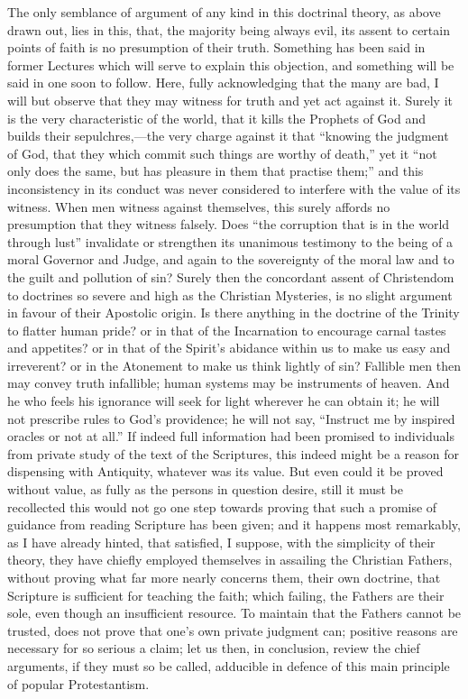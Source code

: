 The only semblance of argument of any kind in this doctrinal
theory, as above drawn out, lies in this, that, the majority being
always evil, its assent to certain points of faith is no presumption
of their truth. Something has been said in former Lectures which will
serve to explain this objection, and something will be said in one
soon to follow. Here, fully acknowledging that the many are bad, I
will but observe that they may witness for truth and yet act
against it. Surely it is the very characteristic of the world, that it
kills the Prophets of God and builds their sepulchres,—the very
charge against it that ``knowing the judgment of God, that they
which commit such things are worthy of death,'' yet it ``not
only does the same, but has pleasure in them that practise them;''
and this inconsistency in its conduct was never considered to
interfere with the value of its witness. When men witness against
themselves, this surely affords no presumption that they witness
falsely. Does ``the corruption that is in the world through
lust'' invalidate or strengthen its unanimous testimony to the
being of a moral Governor and Judge, and again to the sovereignty of
the moral law and to the guilt and pollution of sin? Surely then the
concordant assent of Christendom to doctrines so severe and high as
the Christian Mysteries, is no slight argument in favour of their
Apostolic origin. Is there anything in the doctrine of the Trinity to
flatter human pride? or in that of the Incarnation to encourage carnal
tastes and appetites? or in that of the Spirit's abidance within us to
make us easy and irreverent? or in the Atonement to make us think
lightly of sin? Fallible men then may convey truth infallible; human
systems may be instruments of heaven. And he who feels his ignorance
will seek for light wherever he can obtain it; he will not prescribe
rules to God's providence; he will not say, ``Instruct me by
inspired oracles or not at all.'' If indeed full information had
been promised to individuals from private study of the text of the
Scriptures, this indeed might be a reason for dispensing with
Antiquity, whatever was its value. But even could it be proved without
value, as fully as the persons in question desire, still it must be
recollected this would not go one step towards proving that such a
promise of guidance from reading Scripture has been given; and it
happens most remarkably, as I have already hinted, that satisfied, I
suppose, with the simplicity of their theory, they have chiefly
employed themselves in assailing the Christian Fathers, without
proving what far more nearly concerns them, their own doctrine, that
Scripture is sufficient for teaching the faith; which failing, the
Fathers are their sole, even though an insufficient resource. To
maintain that the Fathers cannot be trusted, does not prove that one's
own private judgment can; positive reasons are necessary for so
serious a claim; let us then, in conclusion, review the chief
arguments, if they must so be called, adducible in defence of this
main principle of popular Protestantism.

